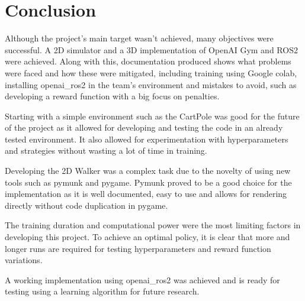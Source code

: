 \chapter{Conclusion}
Although the project's main target wasn't achieved, many objectives were successful. A 2D simulator and a 3D implementation of OpenAI Gym and ROS2 were achieved. Along with this, documentation produced shows what problems were faced and how these were mitigated, including training using Google colab, installing openai\_ros2 in the team's environment and mistakes to avoid, such as developing a reward function with a big focus on penalties. 

Starting with a simple environment such as the CartPole was good for the future of the project as it allowed for developing and testing the code in an already tested environment. It also allowed for experimentation with hyperparameters and strategies without wasting a lot of time in training. 

Developing the 2D Walker was a complex task due to the novelty of using new tools such as pymunk and pygame. Pymunk proved to be a good choice for the implementation as it is well documented, easy to use and allows for rendering directly without code duplication in pygame.

The training duration and computational power were the most limiting factors in developing this project. To achieve an optimal policy, it is clear that more and longer runs are required for testing hyperparameters and reward function variations.

A working implementation using openai\_ros2 was achieved and is ready for testing using a learning algorithm for future research.
